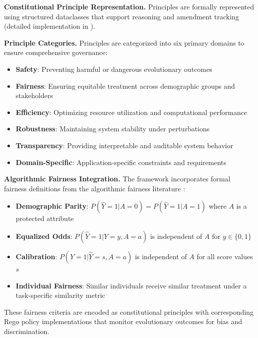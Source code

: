 \documentclass[manuscript,screen,review,anonymous,9pt]{acmart}
\begin{document}
\textbf{Constitutional Principle Representation.} Principles are formally represented using structured dataclasses that support reasoning and amendment tracking (detailed implementation in ).

\textbf{Principle Categories.} Principles are categorized into six primary domains to ensure comprehensive governance:

\begin{itemize}
    \item \textbf{Safety}: Preventing harmful or dangerous evolutionary outcomes
    \item \textbf{Fairness}: Ensuring equitable treatment across demographic groups and stakeholders
    \item \textbf{Efficiency}: Optimizing resource utilization and computational performance
    \item \textbf{Robustness}: Maintaining system stability under perturbations
    \item \textbf{Transparency}: Providing interpretable and auditable system behavior
    \item \textbf{Domain-Specific}: Application-specific constraints and requirements
\end{itemize}

\textbf{Algorithmic Fairness Integration.} The framework incorporates formal fairness definitions from the algorithmic fairness literature \cite{Barocas2023FairnessML, Hardt2016EqualityOpportunity, Chouldechova2017FairPrediction}:

\begin{itemize}
    \item \textbf{Demographic Parity}: $P(\hat{Y} = 1 | A = 0) = P(\hat{Y} = 1 | A = 1)$ where $A$ is a protected attribute
    \item \textbf{Equalized Odds}: $P(\hat{Y} = 1 | Y = y, A = a)$ is independent of $A$ for $y \in \{0,1\}$
    \item \textbf{Calibration}: $P(Y = 1 | \hat{Y} = s, A = a)$ is independent of $A$ for all score values $s$
    \item \textbf{Individual Fairness}: Similar individuals receive similar treatment under a task-specific similarity metric
\end{itemize}

These fairness criteria are encoded as constitutional principles with corresponding Rego policy implementations that monitor evolutionary outcomes for bias and discrimination.
\end{document}
